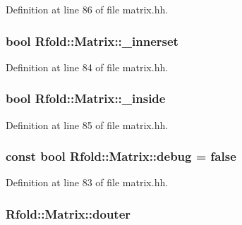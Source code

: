 Definition at line 86 of file matrix.\+hh.

\hypertarget{class_rfold_1_1_matrix_a761e7bc7f006c3ea8b09f9c2d8107e6a}{
\subsubsection[{\+\_\+innerset}]{\setlength{\rightskip}{0pt plus 5cm}bool Rfold\+::\+Matrix\+::\+\_\+innerset}}\label{class_rfold_1_1_matrix_a761e7bc7f006c3ea8b09f9c2d8107e6a}


Definition at line 84 of file matrix.\+hh.

\hypertarget{class_rfold_1_1_matrix_ab5046ea9c3952f87a52002fa583d1e1b}{
\subsubsection[{\+\_\+inside}]{\setlength{\rightskip}{0pt plus 5cm}bool Rfold\+::\+Matrix\+::\+\_\+inside}}\label{class_rfold_1_1_matrix_ab5046ea9c3952f87a52002fa583d1e1b}


Definition at line 85 of file matrix.\+hh.

\hypertarget{class_rfold_1_1_matrix_ad9a9131f0d234138b757dbe76fe62b28}{
\subsubsection[{debug}]{\setlength{\rightskip}{0pt plus 5cm}const bool Rfold\+::\+Matrix\+::debug = false\hspace{0.3cm}{\ttfamily [static]}}}\label{class_rfold_1_1_matrix_ad9a9131f0d234138b757dbe76fe62b28}


Definition at line 83 of file matrix.\+hh.

\hypertarget{class_rfold_1_1_matrix_a95f02edbb0a09ccd75a47f3baf50d1fe}{
\subsubsection[{douter}]{ Rfold\+::\+Matrix\+::douter}}\label{class_rfold_1_1_matrix_a95f02edbb0a09ccd75a47f3baf50d1fe}


